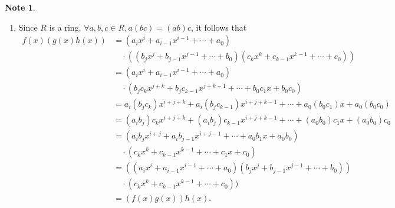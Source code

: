 \documentclass{article}
\theoremstyle{definition}
\newtheorem{note}{Note}[section]
\begin{document}
\begin{note}
\begin{enumerate}
        \item Since $R$ is a ring, $\forall a,b,c\in R, a(bc)=(ab)c$, it follows that
        \begin{align*}
            f(x)(g(x)h(x)) &= (a_ix^i+a_{i-1}x^{i-1}+\cdots+a_0) \\
            & \quad \cdot ((b_jx^j+b_{j-1}x^{j-1}+\cdots+b_0)(c_kx^k+c_{k-1}x^{k-1}+\cdots+c_0)) \\
            &= (a_ix^i+a_{i-1}x^{i-1}+\cdots+a_0) \\ 
            & \quad \cdot (b_jc_kx^{j+k}+b_jc_{k-1}x^{j+k-1}+\cdots+b_0c_1x+b_0c_0) \\
            &= a_i(b_jc_k)x^{i+j+k}+a_i(b_jc_{k-1})x^{i+j+k-1}+\cdots+a_0(b_0c_1)x+a_0(b_0c_0) \\
            &= (a_ib_j)c_kx^{i+j+k}+(a_ib_j)c_{k-1}x^{i+j+k-1}+\cdots+(a_0b_0)c_1x+(a_0b_0)c_0 \\
            &= (a_ib_jx^{i+j}+a_ib_{j-1}x^{i+j-1}+\cdots+a_0b_1x+a_0b_0) \\
            & \quad \cdot (c_kx^k+c_{k-1}x^{k-1}+\cdots+c_1x+c_0) \\
            &= ((a_ix^i+a_{i-1}x^{i-1}+\cdots+a_0)(b_jx^j+b_{j-1}x^{j-1}+\cdots+b_0)) \\
            & \quad \cdot (c_kx^k+c_{k-1}x^{k-1}+\cdots+c_0)) \\
            &= (f(x)g(x))h(x).
        \end{align*}
        

\end{enumerate}
\end{note}
\end{document}
